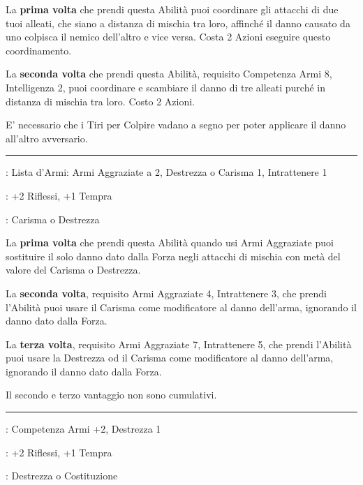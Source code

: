 \begin{multicols}{2}
La \textbf{prima volta} che prendi questa Abilità puoi coordinare gli attacchi di due tuoi alleati, che siano a distanza di mischia tra loro, affinché il danno causato da uno colpisca il nemico dell'altro e vice versa. Costa 2 Azioni eseguire questo coordinamento.

La \textbf{seconda volta} che prendi questa Abilità, requisito Competenza Armi 8, Intelligenza 2, puoi coordinare e scambiare il danno di tre alleati purché in distanza di mischia tra loro. Costo 2 Azioni.

E' necessario che i Tiri per Colpire vadano a segno per poter applicare il danno all'altro avversario.

\smallskip\noindent\rule{\linewidth}{2pt} \hypertarget{Danza della Lama}{}\medskip{}
\noindent
\begin{description}[noitemsep, topsep=0pt, parsep=0pt, partopsep=0pt, leftmargin=0cm, labelwidth=2.5cm]
    \item[\textbf{Requisito}]: Lista d'Armi: Armi Aggraziate a 2, Destrezza o Carisma 1, Intrattenere 1
    \item[\textbf{Tiri Salvezza}]: +2 Riflessi, +1 Tempra
    \item[\textbf{Caratteristica}]: Carisma o Destrezza
\end{description}

La \textbf{prima volta} che prendi questa Abilità quando usi Armi Aggraziate puoi sostituire il solo danno dato dalla Forza negli attacchi di mischia con metà del valore del Carisma o Destrezza.

La \textbf{seconda volta}, requisito Armi Aggraziate 4, Intrattenere 3, che prendi l'Abilità puoi usare il Carisma come modificatore al danno dell'arma, ignorando il danno dato dalla Forza.

La \textbf{terza volta}, requisito Armi Aggraziate 7, Intrattenere 5, che prendi l'Abilità puoi usare la Destrezza od il Carisma come modificatore al danno dell'arma, ignorando il danno dato dalla Forza.

Il secondo e terzo vantaggio non sono cumulativi.

\smallskip\noindent\rule{\linewidth}{2pt} \hypertarget{Daredevil}{}\medskip{}
\noindent
\begin{description}[noitemsep, topsep=0pt, parsep=0pt, partopsep=0pt, leftmargin=0cm, labelwidth=2.5cm]
    \item[\textbf{Requisito}]: Competenza Armi +2, Destrezza 1
    \item[\textbf{Tiri Salvezza}]: +2 Riflessi, +1 Tempra
    \item[\textbf{Caratteristica}]: Destrezza o Costituzione
\end{description}


\end{multicols}
